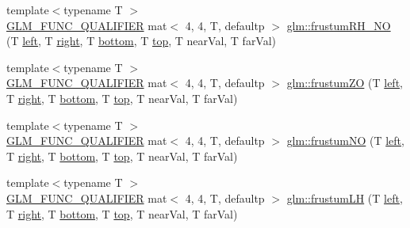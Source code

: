 \begin{DoxyCompactItemize}
\item 
{\footnotesize template$<$typename T $>$ }\\\mbox{\hyperlink{setup_8hpp_a33fdea6f91c5f834105f7415e2a64407}{G\+L\+M\+\_\+\+F\+U\+N\+C\+\_\+\+Q\+U\+A\+L\+I\+F\+I\+ER}} mat$<$ 4, 4, T, defaultp $>$ \mbox{\hyperlink{group__gtc__matrix__transform_ga9236c8439f21be186b79c97b588836b9}{glm\+::frustum\+R\+H\+\_\+\+NO}} (T \mbox{\hyperlink{_s_d_l__opengl__glext_8h_a85b8f6c07fbc1fb5d77c2ae090f21995}{left}}, T \mbox{\hyperlink{_s_d_l__opengl__glext_8h_a5ffadbbacc6b89cf6218bc43b384d3fe}{right}}, T \mbox{\hyperlink{_s_d_l__opengl__glext_8h_a95fc257e5ddf46f7db9d5e898cdf1991}{bottom}}, T \mbox{\hyperlink{_s_d_l__opengl__glext_8h_a5ab323daeacf8dfdb8f91132fecdca23}{top}}, T near\+Val, T far\+Val)
\item 
{\footnotesize template$<$typename T $>$ }\\\mbox{\hyperlink{setup_8hpp_a33fdea6f91c5f834105f7415e2a64407}{G\+L\+M\+\_\+\+F\+U\+N\+C\+\_\+\+Q\+U\+A\+L\+I\+F\+I\+ER}} mat$<$ 4, 4, T, defaultp $>$ \mbox{\hyperlink{group__gtc__matrix__transform_gaa73322e152edf50cf30a6edac342a757}{glm\+::frustum\+ZO}} (T \mbox{\hyperlink{_s_d_l__opengl__glext_8h_a85b8f6c07fbc1fb5d77c2ae090f21995}{left}}, T \mbox{\hyperlink{_s_d_l__opengl__glext_8h_a5ffadbbacc6b89cf6218bc43b384d3fe}{right}}, T \mbox{\hyperlink{_s_d_l__opengl__glext_8h_a95fc257e5ddf46f7db9d5e898cdf1991}{bottom}}, T \mbox{\hyperlink{_s_d_l__opengl__glext_8h_a5ab323daeacf8dfdb8f91132fecdca23}{top}}, T near\+Val, T far\+Val)
\item 
{\footnotesize template$<$typename T $>$ }\\\mbox{\hyperlink{setup_8hpp_a33fdea6f91c5f834105f7415e2a64407}{G\+L\+M\+\_\+\+F\+U\+N\+C\+\_\+\+Q\+U\+A\+L\+I\+F\+I\+ER}} mat$<$ 4, 4, T, defaultp $>$ \mbox{\hyperlink{group__gtc__matrix__transform_gae34ec664ad44860bf4b5ba631f0e0e90}{glm\+::frustum\+NO}} (T \mbox{\hyperlink{_s_d_l__opengl__glext_8h_a85b8f6c07fbc1fb5d77c2ae090f21995}{left}}, T \mbox{\hyperlink{_s_d_l__opengl__glext_8h_a5ffadbbacc6b89cf6218bc43b384d3fe}{right}}, T \mbox{\hyperlink{_s_d_l__opengl__glext_8h_a95fc257e5ddf46f7db9d5e898cdf1991}{bottom}}, T \mbox{\hyperlink{_s_d_l__opengl__glext_8h_a5ab323daeacf8dfdb8f91132fecdca23}{top}}, T near\+Val, T far\+Val)
\item 
{\footnotesize template$<$typename T $>$ }\\\mbox{\hyperlink{setup_8hpp_a33fdea6f91c5f834105f7415e2a64407}{G\+L\+M\+\_\+\+F\+U\+N\+C\+\_\+\+Q\+U\+A\+L\+I\+F\+I\+ER}} mat$<$ 4, 4, T, defaultp $>$ \mbox{\hyperlink{group__gtc__matrix__transform_gae4277c37f61d81da01bc9db14ea90296}{glm\+::frustum\+LH}} (T \mbox{\hyperlink{_s_d_l__opengl__glext_8h_a85b8f6c07fbc1fb5d77c2ae090f21995}{left}}, T \mbox{\hyperlink{_s_d_l__opengl__glext_8h_a5ffadbbacc6b89cf6218bc43b384d3fe}{right}}, T \mbox{\hyperlink{_s_d_l__opengl__glext_8h_a95fc257e5ddf46f7db9d5e898cdf1991}{bottom}}, T \mbox{\hyperlink{_s_d_l__opengl__glext_8h_a5ab323daeacf8dfdb8f91132fecdca23}{top}}, T near\+Val, T far\+Val)

\end{DoxyCompactItemize}
